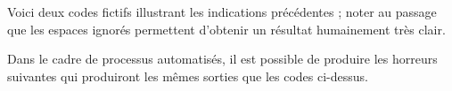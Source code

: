 \documentclass[10pt, a4paper]{article}
\begin{document}


Voici deux codes fictifs illustrant les indications précédentes ; noter au passage que les espaces ignorés permettent d'obtenir un résultat humainement très clair.
\begin{multicols}{2}

\end{multicols}

Dans le cadre de processus automatisés, il est possible de produire les horreurs suivantes qui produiront les mêmes sorties que les codes ci-dessus.
\begin{multicols}{2}

\end{multicols}
\end{document}
